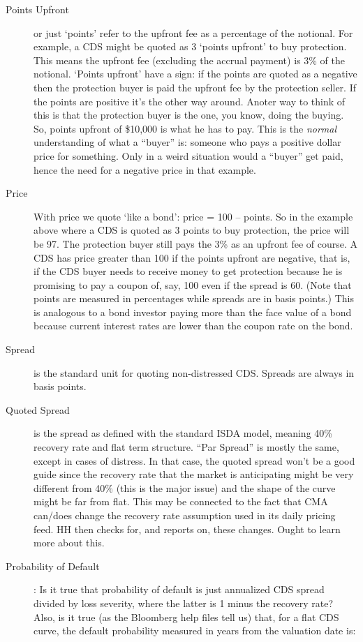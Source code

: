 \documentclass[12pt]{article}
\begin{document}
\begin{description}
  \item[Points Upfront] or just `points' refer to the upfront fee as a percentage of the notional.  For example, a CDS might be quoted as 3 `points upfront' to buy protection.  This means the upfront fee (excluding the accrual payment) is 3\% of the notional.  `Points upfront' have a sign: if the points are quoted as a negative then the protection buyer is paid the upfront fee by the protection seller.  If the points are positive it's the other way around. Anoter way to think of this is that the protection buyer is the one, you know, doing the buying. So, points upfront of \$10,000 is what he has to pay. This is the \emph{normal} understanding of what a ``buyer'' is: someone who pays a positive dollar price for something. Only in a weird situation would a ``buyer'' get paid, hence the need for a negative price in that example.
  \item[Price] With price we quote ‘like a bond’: price = 100 – points.  So in the example above where a CDS is quoted as 3 points to buy protection, the price will be 97.   The protection buyer still pays the 3\% as an upfront fee of course. A CDS has price greater than 100 if the points upfront are negative, that is, if the CDS buyer needs to receive money to get protection because he is promising to pay a coupon of, say,  100 even if the spread is 60. (Note that points are measured in percentages while spreads are in basis points.) This is analogous to a bond investor paying more than the face value of a bond because current interest rates are lower than the coupon rate on the bond.
  \item[Spread] is the standard unit for quoting non-distressed CDS. Spreads are always in basis points.
    \item[Quoted Spread] is the spread as defined with the standard ISDA model, meaning 40\% recovery rate and flat term structure. ``Par Spread'' is mostly the same, except in cases of distress. In that case, the quoted spread won't be a good guide since the recovery rate that the market is anticipating might be very different from 40\% (this is the major issue) and the shape of the curve might be far from flat. This may be connected to the fact that CMA can/does change the recovery rate assumption used in its daily pricing feed. HH then checks for, and reports on, these changes. Ought to learn more about this.
  \item[Probability of Default]: Is it true that probability of default is just annualized CDS spread divided by loss severity, where the latter is 1 minus the recovery rate? Also, is it true (as the Bloomberg help files tell us) that, for a flat CDS curve, the default probability measured in years from the valuation date is:



\end{description}
\end{document}
